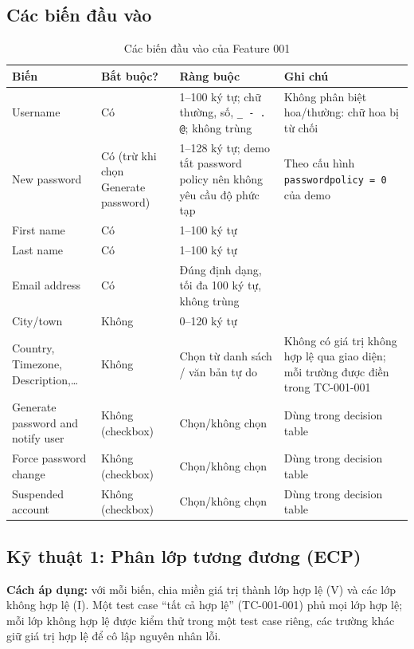 \documentclass[12pt,a4paper]{article}
\begin{document}
\subsection{Các biến đầu vào}
\begin{table}[H]
\centering\small
\begin{tabular}{|L{2.6cm}|L{3.0cm}|L{4.2cm}|L{4.2cm}|}
\hline
{}\textbf{Biến} & \textbf{Bắt buộc?} & \textbf{Ràng buộc} & \textbf{Ghi chú} \\ \hline
Username & Có & 1--100 ký tự; chữ thường, số, \texttt{\_ - . @}; không trùng & Không phân biệt hoa/thường: chữ hoa bị từ chối \\ \hline
New password & Có (trừ khi chọn Generate password) & 1--128 ký tự; demo tắt password policy nên không yêu cầu độ phức tạp & Theo cấu hình \texttt{passwordpolicy = 0} của demo \\ \hline
First name & Có & 1--100 ký tự & \\ \hline
Last name & Có & 1--100 ký tự & \\ \hline
Email address & Có & Đúng định dạng, tối đa 100 ký tự, không trùng & \\ \hline
City/town & Không & 0--120 ký tự & \\ \hline
Country, Timezone, Description,\dots & Không & Chọn từ danh sách / văn bản tự do & Không có giá trị không hợp lệ qua giao diện; mỗi trường được điền trong TC-001-001 \\ \hline
Generate password and notify user & Không (checkbox) & Chọn/không chọn & Dùng trong decision table \\ \hline
Force password change & Không (checkbox) & Chọn/không chọn & Dùng trong decision table \\ \hline
Suspended account & Không (checkbox) & Chọn/không chọn & Dùng trong decision table \\ \hline
\end{tabular}
\caption{Các biến đầu vào của Feature 001}
\end{table}

\subsection{Kỹ thuật 1: Phân lớp tương đương (ECP)}
\textbf{Cách áp dụng:} với mỗi biến, chia miền giá trị thành lớp hợp lệ (V) và các lớp không hợp lệ (I).
Một test case ``tất cả hợp lệ'' (TC-001-001) phủ mọi lớp hợp lệ; mỗi lớp không hợp lệ được kiểm thử trong một test case riêng,
các trường khác giữ giá trị hợp lệ để cô lập nguyên nhân lỗi.
\end{document}
